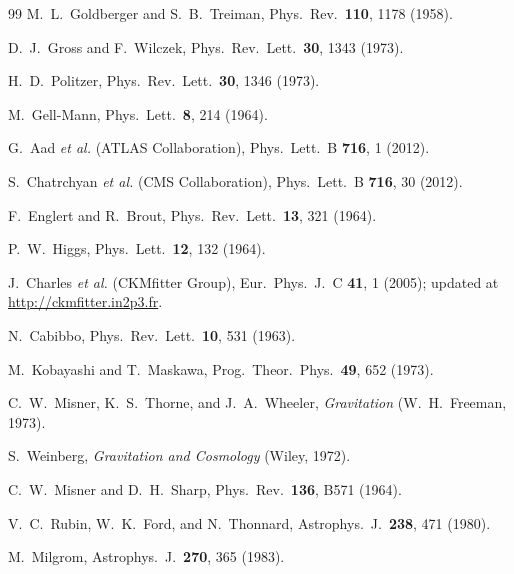 \documentclass[aps,prd,twocolumn,superscriptaddress,nofootinbib,longbibliography]{revtex4-2}
\begin{document}
\begin{thebibliography}{99}
M.~L.~Goldberger and S.~B.~Treiman,
Phys.\ Rev.\ \textbf{110}, 1178 (1958).


D.~J.~Gross and F.~Wilczek,
Phys.\ Rev.\ Lett.\ \textbf{30}, 1343 (1973).

H.~D.~Politzer,
Phys.\ Rev.\ Lett.\ \textbf{30}, 1346 (1973).

M.~Gell-Mann,
Phys.\ Lett.\ \textbf{8}, 214 (1964).


G.~Aad \textit{et al.} (ATLAS Collaboration),
Phys.\ Lett.\ B \textbf{716}, 1 (2012).

S.~Chatrchyan \textit{et al.} (CMS Collaboration),
Phys.\ Lett.\ B \textbf{716}, 30 (2012).

F.~Englert and R.~Brout,
Phys.\ Rev.\ Lett.\ \textbf{13}, 321 (1964).

P.~W.~Higgs,
Phys.\ Lett.\ \textbf{12}, 132 (1964).


J.~Charles \textit{et al.} (CKMfitter Group),
Eur.\ Phys.\ J.\ C \textbf{41}, 1 (2005);
updated at \url{http://ckmfitter.in2p3.fr}.

N.~Cabibbo,
Phys.\ Rev.\ Lett.\ \textbf{10}, 531 (1963).

M.~Kobayashi and T.~Maskawa,
Prog.\ Theor.\ Phys.\ \textbf{49}, 652 (1973).


C.~W.~Misner, K.~S.~Thorne, and J.~A.~Wheeler,
\textit{Gravitation} (W.~H.~Freeman, 1973).

S.~Weinberg,
\textit{Gravitation and Cosmology}
(Wiley, 1972).

C.~W.~Misner and D.~H.~Sharp,
Phys.\ Rev.\ \textbf{136}, B571 (1964).


V.~C.~Rubin, W.~K.~Ford, and N.~Thonnard,
Astrophys.\ J.\ \textbf{238}, 471 (1980).

M.~Milgrom,
Astrophys.\ J.\ \textbf{270}, 365 (1983).



\end{thebibliography}
\end{document}
